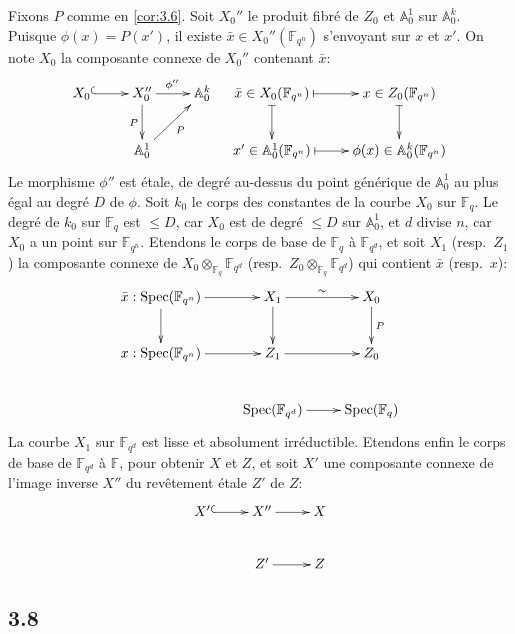 \documentclass[11pt,a4paper]{article}
\theoremstyle{plain}
\theoremstyle{definition}
\DeclareMathOperator{\Spec}{Spec}
\begin{document}
Fixons $P$ comme en \ref{cor:3.6}. Soit $X_0''$ le produit fibr\'e de $Z_0$ et $\mathbb{A}_0^1$ sur $\mathbb{A}_0^k$. Puisque $\phi(x) = P(x')$, il existe $\bar{x} \in X_0''(\mathbb{F}_{q^n})$ s'envoyant sur $x$ et $x'$. On note $X_0$ la composante connexe de $X_0''$ contenant $\bar{x}$:
\begin{equation}\label{eq:3.7.1}
\xymatrix{
X_0 \ar@{^{(}->}[r] & X_0'' \ar[r]^{\phi''} \ar[d]_{P} & \mathbb{A}_0^k \\
& \mathbb{A}_0^1 \ar[ur]_{P} &
}
\quad
\xymatrix{
\bar{x} \in X_0(\mathbb{F}_{q^n}) \ar@{|->}[d] \ar@{|->}[r] & x \in Z_0(\mathbb{F}_{q^n}) \ar@{|->}[d] \\
x' \in \mathbb{A}_0^1(\mathbb{F}_{q^n}) \ar@{|->}[r] & \phi(x) \in \mathbb{A}_0^k(\mathbb{F}_{q^n})
}
\end{equation}
Le morphisme $\phi''$ est \'etale, de degr\'e au-dessus du point g\'en\'erique de $\mathbb{A}_0^1$ au plus \'egal au degr\'e $D$ de $\phi$. Soit $k_0$ le corps des constantes de la courbe $X_0$ sur $\mathbb{F}_q$. Le degr\'e de $k_0$ sur $\mathbb{F}_q$ est $\leq D$, car $X_0$ est de degr\'e $\leq D$ sur $\mathbb{A}_0^1$, et $d$ divise $n$, car $X_0$ a un point sur $\mathbb{F}_{q^n}$. Etendons le corps de base de $\mathbb{F}_q$ \`a $\mathbb{F}_{q^d}$, et soit $X_1$ (resp.~$Z_1$) la composante connexe de $X_0 \otimes_{\mathbb{F}_q} \mathbb{F}_{q^d}$ (resp.~$Z_0 \otimes_{\mathbb{F}_q} \mathbb{F}_{q^d}$) qui contient $\bar{x}$ (resp.~$x$):
\begin{equation}\label{eq:3.7.2}
\xymatrix{
\bar{x}: \Spec(\mathbb{F}_{q^n}) \ar[r] \ar[d] & X_1 \ar[r]^{\sim} \ar[d] & X_0 \ar[d]^{P} \\
x: \Spec(\mathbb{F}_{q^n}) \ar[r] & Z_1 \ar[r] & Z_0 \\
& \Spec(\mathbb{F}_{q^d}) \ar[r] & \Spec(\mathbb{F}_q)
}
\end{equation}
La courbe $X_1$ sur $\mathbb{F}_{q^d}$ est lisse et absolument irr\'eductible. Etendons enfin le corps de base de $\mathbb{F}_{q^d}$ \`a $\mathbb{F}$, pour obtenir $X$ et $Z$, et soit $X'$ une composante connexe de l'image inverse $X''$ du rev\^etement \'etale $Z'$ de $Z$:
\begin{equation}\label{eq:3.7.3}
\xymatrix{
X' \ar@{^{(}->}[r] & X'' \ar[r] & X \\
& Z' \ar[r] & Z
}
\end{equation}

\subsection{3.8}
\end{document}
